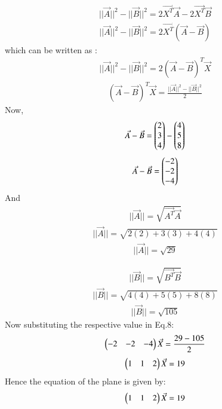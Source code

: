 \documentclass[journal]{IEEEtran}
\theoremstyle{remark}
\begin{document}
\begin{align}
   ||\Vec{A}||^2-||\Vec{B}||^2=2\Vec{X^T}\Vec{A}-2\Vec{X^T}\Vec{B}
\end{align}
\begin{align}
    ||\Vec{A}||^2-||\Vec{B}||^2=2\Vec{X^T}(\Vec{A}-\Vec{B})
\end{align}
which can be written as :
\begin{align}
    ||\Vec{A}||^2-||\Vec{B}||^2=2(\Vec{A}-\Vec{B})^T\Vec{X}
\end{align}
\begin{align}
 (\Vec{A}-\Vec{B})^T\Vec{X}=\frac{||\Vec{A}||^2-||\Vec{B}||^2}{2}
\end{align}
Now,
\begin{align}
    \Vec{A}-\Vec{B}=\begin{pmatrix}2\\3\\4\end{pmatrix}-\begin{pmatrix}4\\5\\8\end{pmatrix}
\end{align}
\begin{align}
   \Vec{A}-\Vec{B}=\begin{pmatrix}-2\\-2\\-4\end{pmatrix}
\end{align}
And
\begin{align}
     ||\Vec{A}||=\sqrt{\Vec{A^T}\Vec{A}}
\end{align}
\begin{align}
    ||\Vec{A}||=\sqrt{2(2)+3(3)+4(4)}
\end{align}
\begin{align}
    ||\Vec{A}||=\sqrt{29}
\end{align}

\begin{align}
     ||\Vec{B}||=\sqrt{\Vec{B^T}\Vec{B}}
\end{align}
\begin{align}
     ||\Vec{B}||=\sqrt{4(4)+5(5)+8(8)}
\end{align}
\begin{align}
    ||\Vec{B}||=\sqrt{105}
\end{align}
Now substituting the respective value in Eq.8:
\begin{align}
	\begin{pmatrix}-2&-2&-4\end{pmatrix}\Vec{X}=\frac{29-105}{2}
\end{align}
\begin{align}
	\begin{pmatrix}1&1&2\end{pmatrix}\Vec{X}=19
\end{align}
Hence the equation of the plane is given by:
\begin{align}
	\begin{pmatrix}1&1&2\end{pmatrix}\Vec{X}=19
\end{align}
\end{document}
